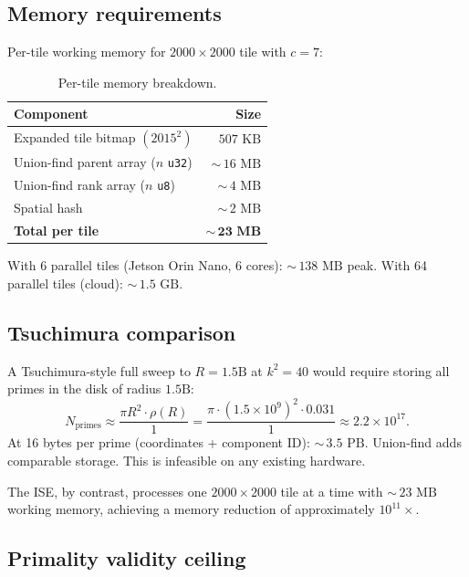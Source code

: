 \documentclass[11pt,a4paper]{article}
\theoremstyle{definition}
\theoremstyle{plain}
\theoremstyle{remark}
\begin{document}
\subsection{Memory requirements}

Per-tile working memory for $2000 \times 2000$ tile with $c = 7$:

\begin{table}[ht]
\centering
\begin{tabular}{@{}lr@{}}
\toprule
Component & Size \\
\midrule
Expanded tile bitmap $(2015^2)$            & $507\text{ KB}$ \\
Union-find parent array ($n$ \texttt{u32}) & ${\sim}\,16\text{ MB}$ \\
Union-find rank array ($n$ \texttt{u8})    & ${\sim}\,4\text{ MB}$ \\
Spatial hash                               & ${\sim}\,2\text{ MB}$ \\
\midrule
\textbf{Total per tile}                    & $\mathbf{{\sim}\,23\textbf{ MB}}$ \\
\bottomrule
\end{tabular}
\caption{Per-tile memory breakdown.}
\label{tab:memory}
\end{table}

With 6 parallel tiles (Jetson Orin Nano, 6 cores): ${\sim}\,138\text{ MB}$ peak.  With 64 parallel tiles (cloud): ${\sim}\,1.5\text{ GB}$.

\subsection{Tsuchimura comparison}

A Tsuchimura-style full sweep to $R = 1.5\text{B}$ at $k^2 = 40$ would require storing all primes in the disk of radius $1.5\text{B}$:
\[
  N_{\text{primes}} \approx \frac{\pi R^2 \cdot \rho(R)}{1} = \frac{\pi \cdot (1.5 \times 10^9)^2 \cdot 0.031}{1} \approx 2.2 \times 10^{17}.
\]
At 16 bytes per prime (coordinates + component ID): ${\sim}\,3.5\text{ PB}$.  Union-find adds comparable storage.  This is infeasible on any existing hardware.

The ISE, by contrast, processes one $2000 \times 2000$ tile at a time with ${\sim}\,23\text{ MB}$ working memory, achieving a memory reduction of approximately $10^{11}\times$.

\subsection{Primality validity ceiling}
\end{document}
